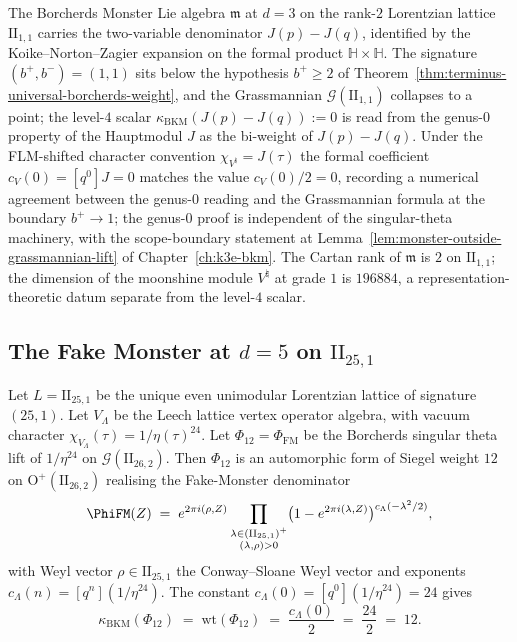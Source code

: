 \begin{remark}[Scope-boundary: the Borcherds Monster at $d = 3$ on
$\mathrm{II}_{1, 1}$]
\label{rem:terminus-monster-scope-boundary}
The Borcherds Monster Lie algebra $\mathfrak{m}$ at $d = 3$ on the
rank-$2$ Lorentzian lattice $\mathrm{II}_{1, 1}$ carries the
two-variable denominator $J(p) - J(q)$, identified by the
Koike--Norton--Zagier expansion
\cite[Theorem~10.1]{Borcherds1992} on the formal product
$\mathbb H \times \mathbb H$.  The signature $(b^+, b^-) = (1, 1)$
sits below the hypothesis $b^+ \ge 2$ of
Theorem~\ref{thm:terminus-universal-borcherds-weight}, and the
Grassmannian $\mathcal G(\mathrm{II}_{1, 1})$ collapses to a point;
the level-$4$ scalar $\kappa_{\mathrm{BKM}}(J(p)-J(q)) := 0$ is read
from the genus-$0$ property of the Hauptmodul $J$ as the bi-weight
of $J(p) - J(q)$.  Under the FLM-shifted character convention
$\chi_{V^\natural} = J(\tau)$ the formal coefficient $c_V(0) =
[q^0] J = 0$ matches the value $c_V(0)/2 = 0$, recording a
numerical agreement between the genus-$0$ reading and the
Grassmannian formula at the boundary
$b^+ \to 1$; the genus-$0$ proof
\cite[Theorem~8.1, Theorem~10.1]{Borcherds1992} is independent of
the singular-theta machinery, with the scope-boundary statement at
Lemma~\ref{lem:monster-outside-grassmannian-lift} of
Chapter~\ref{ch:k3e-bkm}.  The Cartan rank of $\mathfrak{m}$ is $2$ on
$\mathrm{II}_{1, 1}$; the dimension of the moonshine module
$V^\natural$ at grade $1$ is $196884$, a representation-theoretic
datum separate from the level-$4$ scalar.
\end{remark}

\subsection{The Fake Monster at $d = 5$ on $\mathrm{II}_{25, 1}$}
\label{subsec:terminus-fake-monster-d5}

\begin{theorem}[Fake-Monster Borcherds weight at $d = 5$]
\label{thm:terminus-fake-monster-weight}
Let $L = \mathrm{II}_{25, 1}$ be the unique even unimodular
Lorentzian lattice of signature $(25, 1)$.  Let $V_\Lambda$ be the
Leech lattice vertex operator algebra, with vacuum character
$\chi_{V_\Lambda}(\tau) = 1/\eta(\tau)^{24}$.  Let $\Phi_{12} =
\Phi_{\mathrm{FM}}$ be the Borcherds singular theta lift of
$1/\eta^{24}$ on $\mathcal G(\mathrm{II}_{26, 2})$.  Then
$\Phi_{12}$ is an automorphic form of Siegel weight $12$ on
$\mathrm{O}^+(\mathrm{II}_{26, 2})$ realising the Fake-Monster
denominator
\[
 \PhiFM(Z) \;=\; e^{2\pi i (\rho, Z)}
 \prod_{\substack{\lambda \in (\mathrm{II}_{25, 1})^+ \\ (\lambda, \rho) > 0}}
 \bigl(1 - e^{2\pi i (\lambda, Z)}\bigr)^{c_\Lambda(-\lambda^2/2)},
\]
with Weyl vector $\rho \in \mathrm{II}_{25, 1}$ the Conway--Sloane
Weyl vector and exponents $c_\Lambda(n) = [q^n](1/\eta^{24})$.  The
constant $c_\Lambda(0) = [q^0](1/\eta^{24}) = 24$ gives
\[
 \kappa_{\mathrm{BKM}}(\Phi_{12}) \;=\; \mathrm{wt}(\Phi_{12}) \;=\;
 \frac{c_\Lambda(0)}{2} \;=\; \frac{24}{2} \;=\; 12.
\]
\end{theorem}


